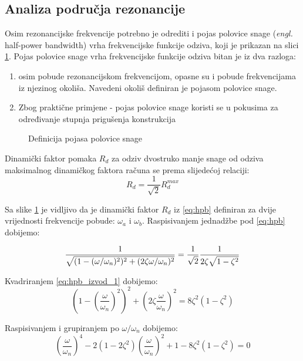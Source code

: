 \subsection{Analiza područja rezonancije}
Osim rezonancijske frekvencije potrebno je odrediti i pojas polovice snage
(\textit{engl.} half-power bandwidth) vrha frekvencijske funkcije odziva, 
koji je prikazan na slici \ref{fig:hpb}. Pojas polovice snage vrha frekvencijske funkcije
odziva bitan je iz dva razloga:
\begin{enumerate}
    \item osim pobude rezonancijskom frekvencijom, opasne su i pobude frekvencijama iz
        njezinog okoliša. Navedeni okoliš definiran je pojasom polovice snage.
    \item Zbog praktične primjene - pojas polovice snage koristi se u pokusima
        za određivanje stupnja prigušenja konstrukcija
\end{enumerate}
\begin{figure}[H]
    
    \caption{Definicija pojasa polovice snage}
    \label{fig:hpb}
\end{figure}
Dinamički faktor pomaka $R_d$ za odziv dvostruko manje snage od odziva maksimalnog
dinamičkog faktora računa se prema slijedećoj relaciji:
\begin{equation}\label{eq:hpb}
    R_d = \frac{1}{\sqrt{2}}R_d^{max}
\end{equation}

Sa slike \ref{fig:hpb} je vidljivo da je dinamički faktor $R_d$ iz \eqref{eq:hpb} definiran za
dvije vrijednosti frekvencije pobude: $\omega_a$ i $\omega_b$. Raspisivanjem
jednadžbe pod \eqref{eq:hpb} dobijemo:

\begin{equation}\label{eq:hpb_izvod_1}
        \frac{1}{\sqrt{(1-(\omega/\omega_n)^2)^2+(2\zeta\omega/\omega_n)^2}}=
            \frac{1}{\sqrt{2}}\frac{1}{2\zeta\sqrt{1-\zeta^2}}\\
\end{equation}

Kvadriranjem \eqref{eq:hpb_izvod_1} dobijemo:
\begin{equation}\label{eq:hpb_izvod_2}
    \left(1-\left(\frac{\omega}{\omega_n}\right)^2\right)^2
    +\left(2\zeta\frac{\omega}{\omega_n}\right)^2 =
    8\zeta^2(1-\zeta^2)
\end{equation}

Raspisivanjem i grupiranjem po $\omega/\omega_n$ dobijemo:
\begin{equation}\label{eq:hpb_izvod_3}
    \left(\frac{\omega}{\omega_n}\right)^4
    -2(1-2\zeta^2)\left(\frac{\omega}{\omega_n}\right)^2
    +1-8\zeta^2(1-\zeta^2)=0
\end{equation}

